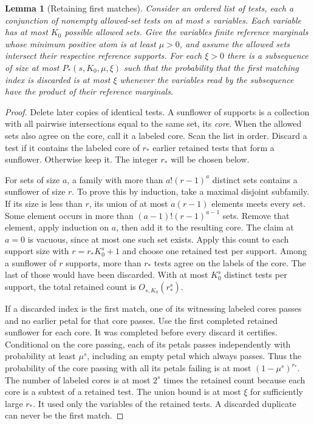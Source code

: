 \documentclass[11pt]{article}
\newtheorem{lemma}[theorem]{Lemma}
\begin{document}
\begin{lemma}[Retaining first matches]\label{lem:filter}
Consider an ordered list of tests, each a conjunction of nonempty
allowed-set tests on at most $s$ variables. Each variable has at most
$K_0$ possible allowed sets. Give the variables finite reference
marginals whose minimum positive atom is at least $\mu>0$, and assume
the allowed sets intersect their respective reference supports.
For each $\xi>0$ there is a subsequence of size at most
$P_*(s,K_0,\mu,\xi)$ such that the probability that the first matching
index is discarded is at most $\xi$ whenever the variables read by
the subsequence have the product of their reference marginals.
\end{lemma}
\begin{proof}
Delete later copies of identical tests. A sunflower of supports is a
collection with all pairwise intersections equal to the same set, its
\emph{core}. When the allowed sets also agree on the core, call it a
labeled core. Scan the list in order. Discard a test if it contains
the labeled core of $r_*$ earlier retained tests that form a
sunflower. Otherwise keep it. The integer $r_*$ will be chosen below.

For sets of size $a$, a family with more than $a!(r-1)^a$ distinct
sets contains a sunflower of size $r$. To prove this by induction,
take a maximal disjoint subfamily. If its size is less than $r$, its
union of at most $a(r-1)$ elements meets every set. Some element occurs
in more than $(a-1)!(r-1)^{a-1}$ sets. Remove that element, apply
induction on $a$, then add it to the resulting core. The claim at
$a=0$ is vacuous, since at most one such set exists. Apply this count
to each support size with $r=r_*K_0^s+1$ and choose one retained
test per support. Among a sunflower of $r$ supports, more than
$r_*$ tests agree on the labels of the core. The last of those
would have been discarded. With at most $K_0^s$ distinct tests
per support, the total retained count is $O_{s,K_0}(r_*^s)$.

If a discarded index is the first match, one of its witnessing
labeled cores passes and no earlier petal for that core passes.
Use the first completed retained sunflower for each core. It
was completed before every discard it certifies. Conditional on
the core passing, each of its petals passes independently with
probability at least $\mu^s$, including an empty petal which
always passes. Thus the probability of the core passing with
all its petals failing is at most $(1-\mu^s)^{r_*}$.
The number of labeled cores is at most $2^s$ times the retained
count because each core is a subtest of a retained test.
The union bound is at most $\xi$ for sufficiently large $r_*$.
It used only the variables of the retained tests. A discarded
duplicate can never be the first match.
\end{proof}
\end{document}
